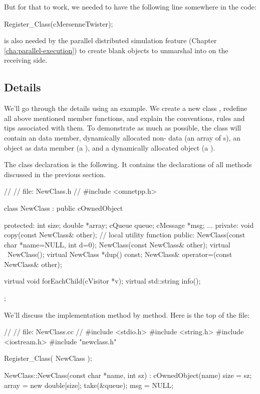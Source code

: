 But for that to work, we needed to have the following line somewhere in the code:

\begin{cpp}
Register_Class(cMersenneTwister);
\end{cpp}

 is also needed by the parallel distributed simulation feature
(Chapter \ref{cha:parallel-execution}) to create blank objects to unmarshal into
on the receiving side.


\subsection{Details}

We'll go through the details using an example. We create a new
class , redefine all above mentioned 
member functions, and explain the conventions, rules and tips
associated with them.
To demonstrate as much as possible, the class will contain
an  data member, dynamically allocated non- data
(an array of s),
an {\opp} object as data member (a ), and
a dynamically allocated {\opp} object (a ).

The class declaration is the following. It contains the declarations
of all methods discussed in the previous section.

\begin{cpp}
//
// file: NewClass.h
//
#include <omnetpp.h>

class NewClass : public cOwnedObject
{
  protected:
    int size;
    double *array;
    cQueue queue;
    cMessage *msg;
    ...
  private:
    void copy(const NewClass& other); // local utility function
  public:
    NewClass(const char *name=NULL, int d=0);
    NewClass(const NewClass& other);
    virtual ~NewClass();
    virtual NewClass *dup() const;
    NewClass& operator=(const NewClass& other);

    virtual void forEachChild(cVisitor *v);
    virtual std::string info();
};
\end{cpp}

We'll discuss the implementation method by method.
Here is the top of the  file:

\begin{cpp}
//
// file: NewClass.cc
//
#include <stdio.h>
#include <string.h>
#include <iostream.h>
#include "newclass.h"

Register_Class( NewClass );


NewClass::NewClass(const char *name, int sz) : cOwnedObject(name)
{
    size = sz;
    array = new double[size];
    take(&queue);
    msg = NULL;
}
\end{cpp}


